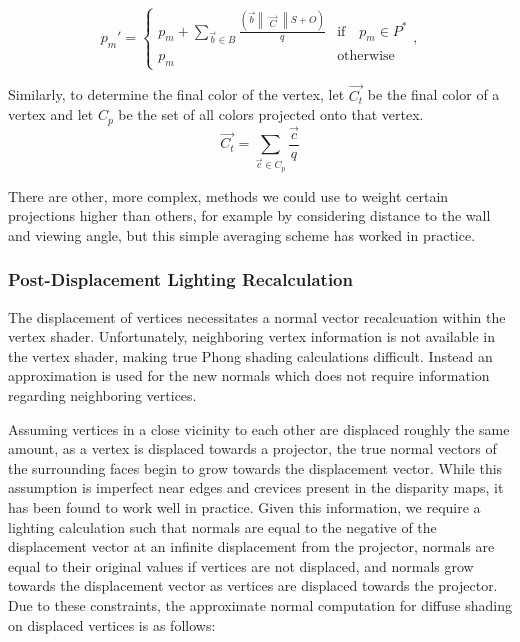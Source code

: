 \documentclass[a4paper,twoside]{article}
\begin{document}
\begin{equation}
p_{m}' = \left \{ 
\begin{array}{ll}
p_{m} + \sum\limits_{\vec{b} \in B} \frac{(\vec{b} \begin{Vmatrix}\vec{C}\end{Vmatrix} S + O)}{q} & \text{if} \quad p_{m} \in P^{*}\\
p_{m} & \text{otherwise}
\end{array},\right.
\label{eq:displaceBlend}
\end{equation}

Similarly, to determine the final color of the vertex, let $\vec{C_t}$ be the final color of a vertex and let $C_p$ be the set of all colors projected onto that vertex. 
\begin{equation}
\vec{C_t} = \sum\limits_{\vec{c} \in C_p} \frac{\vec{c}}{q} 
\label{eq:colorBlend}
\end{equation}

There are other, more complex, methods we could use to weight certain projections higher than others, for example by considering distance to the wall and viewing angle, but this simple averaging scheme has worked in practice. 

\subsubsection{Post-Displacement Lighting Recalculation}

The displacement of vertices necessitates a normal vector recalcuation within the vertex shader. Unfortunately, neighboring vertex information is not available in the vertex shader, making true Phong shading calculations difficult. Instead an approximation is used for the new normals which does not require information regarding neighboring vertices.

Assuming vertices in a close vicinity to each other are displaced roughly the same amount, as a vertex is displaced towards a projector, the true normal vectors of the surrounding faces begin to grow towards the displacement vector. While this assumption is imperfect near edges and crevices present in the disparity maps, it has been found to work well in practice. 
Given this information, we require a lighting calculation such that normals are equal to the negative of the displacement vector at an infinite displacement from the projector, normals are equal to their original values if vertices are not displaced, and normals grow towards the displacement vector as vertices are displaced towards the projector. Due to these constraints, the approximate normal computation for diffuse shading on displaced vertices is as follows:
\end{document}
